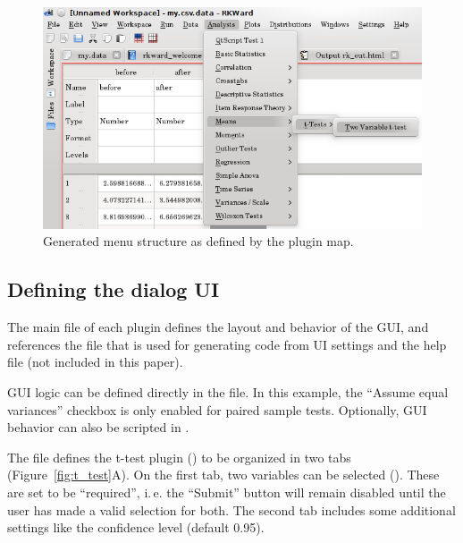 \begin{figure}[htp]
 \centering
 \includegraphics{../figures/ttest-gui-example.png}
 \caption{Generated menu structure as defined by the plugin map.}
 \label{fig:ttest-gui-example}
\end{figure}


\subsection {Defining the dialog UI}
\label{sec:defining_dialog_ui}
The main  file of each plugin defines the layout and behavior of the GUI, and references the
 file that is used for generating  code from UI settings and the help file (not included in this paper).

GUI logic can be defined directly in the  file. In this example, the ``Assume equal variances'' checkbox
is only enabled for paired sample tests. Optionally, GUI behavior can also be scripted in .

The  file defines the t-test plugin () to be organized in two tabs (Figure~\ref{fig:t_test}A).
On the first tab, two variables can be selected (). These are set to be ``required'', i.\,e.
the ``Submit'' button will remain disabled until the user has made a valid selection for both. The second tab includes some
additional settings like the confidence level (default 0.95).


